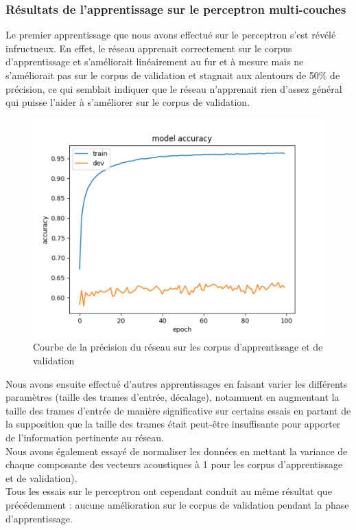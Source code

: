 \documentclass{article}
\begin{document}
\subsubsection{Résultats de l'apprentissage sur le perceptron multi-couches}

Le premier apprentissage que nous avons effectué sur le perceptron s'est révélé infructueux. En effet, le réseau apprenait correctement sur le corpus d'apprentissage et s'améliorait linéairement au fur et à mesure mais ne s'améliorait pas sur le corpus de validation et stagnait aux alentours de 50\% de précision, ce qui semblait indiquer que le réseau n'apprenait rien d'assez général qui puisse l'aider à s'améliorer sur le corpus de validation.\\

\hphantom{.}
\begin{figure}[h]
  \centerline{\includegraphics[scale=0.6]{img/courbe_acc.png}}
  \caption{Courbe de la précision du réseau sur les corpus d'apprentissage et de validation}
\end{figure}

Nous avons ensuite effectué d'autres apprentissages en faisant varier les différents paramètres (taille des trames d'entrée, décalage), notamment en augmentant la taille des trames d'entrée de manière significative sur certains essais en partant de la supposition que la taille des trames était peut-être insuffisante pour apporter de l'information pertinente au réseau.\\
\noindent Nous avons également essayé de normaliser les données en mettant la variance de chaque composante des vecteurs acoustiques à 1 pour les corpus d'apprentissage et de validation).\\
\noindent Tous les essais sur le perceptron ont cependant conduit au même résultat que précédemment : aucune amélioration sur le corpus de validation pendant la phase d'apprentissage.
\end{document}
